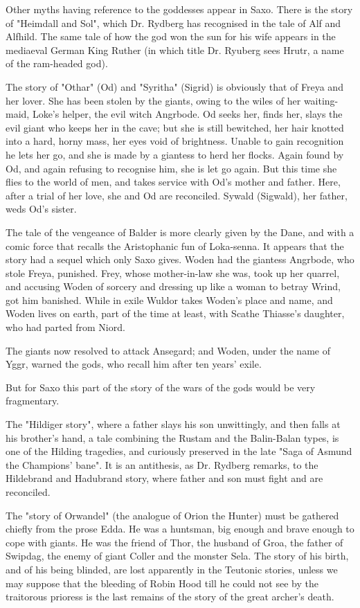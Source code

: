 \documentclass[10pt,a4paper]{report}
\begin{document}
Other myths having reference to the goddesses appear in Saxo. There is the story of "Heimdall and Sol", which Dr. Rydberg has recognised in the tale of Alf and Alfhild. The same tale of how the god won the sun for his wife appears in the mediaeval German King Ruther (in which title Dr. Ryuberg sees Hrutr, a name of the ram-headed god).

The story of "Othar" (Od) and "Syritha" (Sigrid) is obviously that of Freya and her lover. She has been stolen by the giants, owing to the wiles of her waiting-maid, Loke's helper, the evil witch Angrbode. Od seeks her, finds her, slays the evil giant who keeps her in the cave; but she is still bewitched, her hair knotted into a hard, horny mass, her eyes void of brightness. Unable to gain recognition he lets her go, and she is made by a giantess to herd her flocks. Again found by Od, and again refusing to recognise him, she is let go again. But this time she flies to the world of men, and takes service with Od's mother and father. Here, after a trial of her love, she and Od are reconciled. Sywald (Sigwald), her father, weds Od's sister.

The tale of the vengeance of Balder is more clearly given by the Dane, and with a comic force that recalls the Aristophanic fun of Loka-senna. It appears that the story had a sequel which only Saxo gives. Woden had the giantess Angrbode, who stole Freya, punished. Frey, whose mother-in-law she was, took up her quarrel, and accusing Woden of sorcery and dressing up like a woman to betray Wrind, got him banished. While in exile Wuldor takes Woden's place and name, and Woden lives on earth, part of the time at least, with Scathe Thiasse's daughter, who had parted from Niord.

The giants now resolved to attack Ansegard; and Woden, under the name of Yggr, warned the gods, who recall him after ten years' exile.

But for Saxo this part of the story of the wars of the gods would be very fragmentary.

The "Hildiger story", where a father slays his son unwittingly, and then falls at his brother's hand, a tale combining the Rustam and the Balin-Balan types, is one of the Hilding tragedies, and curiously preserved in the late "Saga of Asmund the Champions' bane". It is an antithesis, as Dr. Rydberg remarks, to the Hildebrand and Hadubrand story, where father and son must fight and are reconciled.

The "story of Orwandel" (the analogue of Orion the Hunter) must be gathered chiefly from the prose Edda. He was a huntsman, big enough and brave enough to cope with giants. He was the friend of Thor, the husband of Groa, the father of Swipdag, the enemy of giant Coller and the monster Sela. The story of his birth, and of his being blinded, are lost apparently in the Teutonic stories, unless we may suppose that the bleeding of Robin Hood till he could not see by the traitorous prioress is the last remains of the story of the great archer's death.
\end{document}
